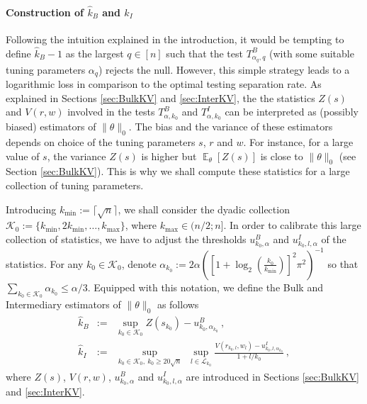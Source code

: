 \documentclass[twoside,11pt]{article}
\def\cK{\mathcal{K}}
\def\cL{\mathcal{L}}
\newcommand{\E}{\operatorname{\mathbb{E}}}
\newcommand{\<}{\langle}
\renewcommand{\>}{\rangle}
\begin{document}
\paragraph{Construction of $\widehat{k}_B$ and $\widehat{k}_I$}


 
Following  the intuition explained in the introduction, it would be tempting to define $\widehat{k}_B-1$ as the largest $q\in [n]$ such that the test $T^B_{\alpha_{q},q}$ (with some suitable tuning parameters $\alpha_q$) rejects the null. However, this simple strategy leads to a logarithmic loss in comparison to the optimal testing separation rate. 
 As explained in  Sections  \ref{sec:BulkKV} and \ref{sec:InterKV}, the the  statistics $Z(s)$ and $V(r,w)$ involved in the tests $T^{B}_{\alpha,k_0}$ and $T^{I}_{\alpha,k_0}$ can be interpreted as (possibly biased) estimators of $\|\theta\|_0$. The bias and the variance of these estimators depends on choice of the tuning parameters $s$, $r$ and $w$. For instance, for a large value of $s$, the variance $Z(s)$ is higher but $\E_{\theta}[Z(s)]$ is close to $\|\theta\|_0$ (see Section \ref{sec:BulkKV}). This is why we shall compute these statistics for a large collection of tuning parameters.
 
 Introducing $k_{\min}:=\lceil \sqrt{n}\rceil$, we shall consider the dyadic collection $\cK_0:= \{k_{\min},2k_{\min},\ldots, k_{\max}\}$, where $k_{\max}\in (n/2;n]$. In order to calibrate this large collection of statistics, we have to adjust the thresholds $u^B_{k_0,\alpha}$ and $u^{I}_{k_0,l,\alpha}$ of the statistics. For any $k_0\in \cK_0$, denote $\alpha_{k_0}:= 2\alpha([1+\log_2(\tfrac{k_0}{k_{\min}})]^2 \pi^2)^{-1}$ so that $\sum_{k_0\in \cK_0}\alpha_{k_0}\leq \alpha/3$. 
Equipped with this notation, we define the Bulk and Intermediary estimators of $\|\theta\|_0$ as follows
\begin{eqnarray}\label{eq:hat_kb}
\widehat{k}_B&:=& \sup_{k_0\in \cK_0} Z(s_{k_0}) - u_{k_0,\alpha_{k_0}}^B\ , \\
 \widehat{k}_I&:=& \sup_{k_0\in \cK_0,\ k_0\geq 20\sqrt{n}}\,\,\sup_{l\in\cL_{k_0}}\frac{V(r_{k_0,l},w_l) - u^I_{k_0,l,\alpha_{k_0}}}{1+l/k_0} \label{eq:hat_kI}\ ,
 \end{eqnarray}
 where $Z(s)$, $V(r,w)$, $u_{k_0,\alpha}^{B}$ and $u_{k_0,l,\alpha}^I$ are introduced in Sections  \ref{sec:BulkKV} and \ref{sec:InterKV}.
 
 
 
 
 
 
\end{document}
